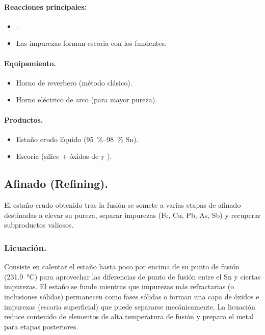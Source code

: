 \documentclass[12pt,a4paper]{article}
\begin{document}
\paragraph{Reacciones principales:}

\begin{itemize}
    \item {}.
    \item Las impurezas forman escoria con los fundentes.
\end{itemize}

\paragraph{Equipamiento.}

\begin{itemize}
    \item Horno de reverbero (método clásico).
    \item Horno eléctrico de arco (para mayor pureza).
\end{itemize}

\paragraph{Productos.}

\begin{itemize}
    \item Estaño crudo líquido (\SIrange[range-phrase = { - }, range-units=single]{95}{98}{\percent} Sn).
    \item Escoria (sílice + óxidos de  y ).
\end{itemize}

\subsection{Afinado (Refining).}

El estaño crudo obtenido tras la fusión se somete a varias etapas de afinado destinadas a elevar su pureza, separar impurezas (Fe, Cu, Pb, As, Sb) y recuperar subproductos valiosos.

\subsubsection{Licuación.}

Consiste en calentar el estaño hasta poco por encima de su punto de fusión (\SI{231.9}{\celsius}) para aprovechar las diferencias de punto de fusión entre el Sn y ciertas impurezas. El estaño se funde mientras que impurezas más refractarias (o inclusiones sólidas) permanecen como fases sólidas o forman una capa de óxidos e impurezas (escoria superficial) que puede separarse mecánicamente. La licuación reduce contenido de elementos de alta temperatura de fusión y prepara el metal para etapas posteriores.
\end{document}
